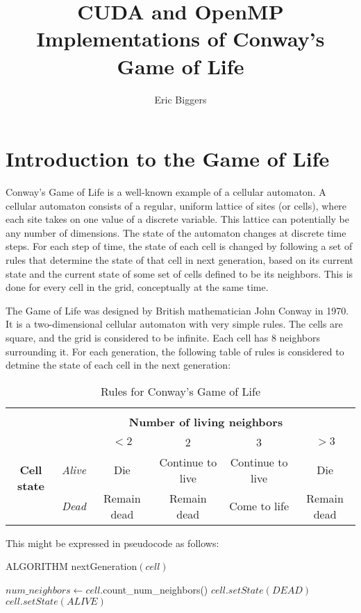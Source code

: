 \documentclass[letterpaper,12pt]{article}
\title{CUDA and OpenMP Implementations of Conway's Game of Life}
\author{Eric Biggers}
\begin{document}
\maketitle

\section{Introduction to the Game of Life}

Conway's Game of Life is a well-known example of a cellular automaton.  A
cellular automaton consists of a regular, uniform lattice of sites (or cells),
where each site takes on one value of a discrete variable.\cite{wolfram}  This
lattice can potentially be any number of dimensions.  The state of the automaton
changes at discrete time steps.  For each step of time, the state of each
cell is changed by following a set of rules that determine the state of that
cell in next generation, based on its current state and the current state of
some set of cells defined to be its neighbors.  This is done for every cell in
the grid, conceptually at the same time. 

The Game of Life was designed by British mathematician John Conway in
1970.\cite{gol}  It
is a two-dimensional cellular automaton with very simple rules.  The cells are
square, and the grid is considered to be infinite.  Each cell has 8 neighbors
surrounding it.  For each generation, the following table of rules is considered
to detmine the state of each cell in the next generation:

\begin{table}[H]
\caption{Rules for Conway's Game of Life}
\begin{tabular}{cc|c|c|c|c|}
& \multicolumn{5}{c}{} \\
& \multicolumn{5}{c}{\bf Number of living neighbors} \\
\multirow{3}{*}{\bf Cell state} && $< 2$& 2 & 3 & $> 3$  \\ \cline{2-6}
&{\em Alive} & Die & Continue to live & Continue to live & Die \\ \cline{2-6}
&{\em Dead} & Remain dead & Remain dead &  Come to life & Remain dead \\ \cline{2-6}
\end{tabular}
\end{table}

This might be expressed in pseudocode as follows:

\begin{algorithm}[H]
\caption{ALGORITHM {\sc nextGeneration}$(cell)$}
\begin{algorithmic}
\STATE $num\_neighbors \gets cell.${\sc count\_num\_neighbors}()
		\STATE $cell.setState(DEAD)$
	\ENDIF
\ELSE
		\STATE $cell.setState(ALIVE)$
	\ENDIF
\ENDIF
\end{algorithmic}
\end{algorithm}
\end{document}
